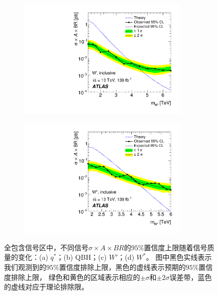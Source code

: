 \begin{figure}[!thbp]
\begin{subfigure}{.5\textwidth}
  \caption{}
  \end{subfigure}
\newline 
  \begin{subfigure}{.5\textwidth}
  \centering
  \includegraphics[width=0.9\textwidth]{figs/fig_04c.pdf}
  \caption{}
  \end{subfigure}
  \begin{subfigure}{.5\textwidth}
  \centering
  \includegraphics[width=0.9\textwidth]{figs/fig_04d.pdf}
  \caption{}
  \end{subfigure}
  \caption{
  全包含信号区中，不同信号$\sigma\times A \times BR$的$95\%$置信度上限随着信号质量的变化：(a) $q^*$；(b) QBH；(c) $W'$；(d) $W^*$。
  图中黑色实线表示我们观测到的$95\%$置信度排除上限，黑色的虚线表示预期的$95\%$置信度排除上限，
  绿色和黄色的区域表示相应的$\pm \sigma$和$\pm 2\sigma$误差带，蓝色的虚线对应于理论排除限。
}
\label{fig:inclusive}
\end{figure}


